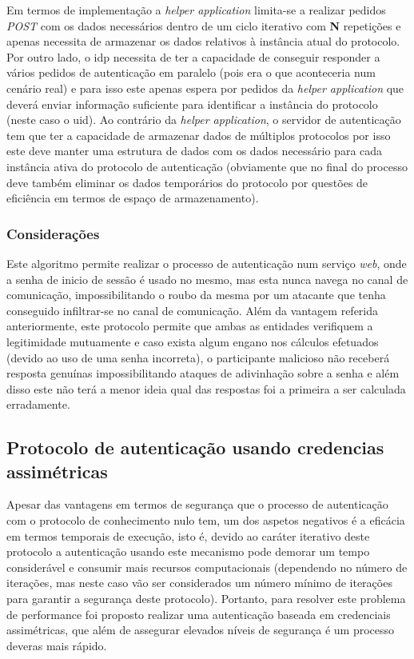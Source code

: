 \quad Em termos de implementação a \textit{helper application} limita-se a realizar pedidos \textit{POST} com os dados necessários dentro de um ciclo iterativo com \textbf{N} repetições e apenas necessita de armazenar os dados relativos à instância atual do protocolo. Por outro lado, o idp necessita de ter a capacidade de conseguir responder a vários pedidos de autenticação  em paralelo (pois era o que aconteceria num cenário real) e para isso este apenas espera por pedidos da \textit{helper application} que deverá enviar informação suficiente para identificar a instância do protocolo (neste caso o uid). Ao contrário da \textit{helper application}, o servidor de autenticação tem que ter a capacidade de armazenar dados de múltiplos protocolos por isso este deve manter uma estrutura de dados com os dados necessário para cada instância ativa do protocolo de autenticação (obviamente que no final do processo deve também eliminar os dados temporários do protocolo por questões de eficiência em termos de espaço de armazenamento).


\subsubsection{Considerações}

\quad Este algoritmo permite realizar o processo de autenticação num serviço \textit{web}, onde a senha de inicio de sessão é usado no mesmo, mas esta nunca navega no canal de comunicação, impossibilitando o roubo da mesma por um atacante que tenha conseguido infiltrar-se no canal de comunicação. Além da vantagem referida anteriormente, este protocolo permite que ambas as entidades verifiquem a legitimidade mutuamente e caso exista algum engano nos cálculos efetuados (devido ao uso de uma senha incorreta), o participante malicioso não receberá resposta genuínas impossibilitando  ataques de adivinhação sobre a senha e além disso este não terá a menor ideia qual das respostas foi a primeira a ser calculada erradamente.


\subsection{Protocolo de autenticação usando credencias assimétricas}

\quad Apesar das vantagens em termos de segurança que o processo de autenticação com o protocolo de conhecimento nulo tem, um dos aspetos negativos é a eficácia em termos temporais de execução, isto é, devido ao caráter iterativo deste protocolo a autenticação usando este mecanismo pode demorar um tempo considerável e consumir mais recursos computacionais (dependendo no número de iterações, mas neste caso vão ser considerados um número mínimo de iterações para garantir a segurança deste protocolo). Portanto, para resolver este problema de performance foi proposto realizar uma autenticação baseada em credenciais assimétricas, que além de assegurar elevados níveis de segurança é um processo deveras mais rápido.

